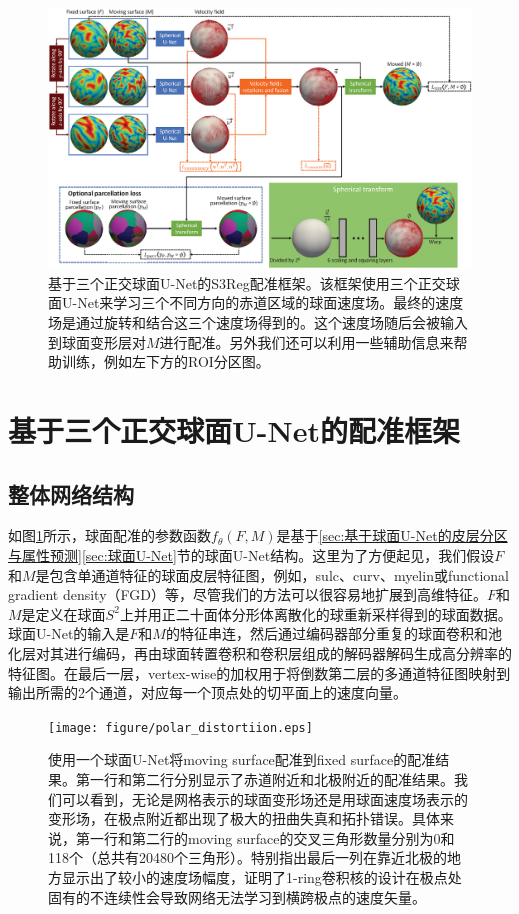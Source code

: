 \begin{figure}[t]
	\centering
	\includegraphics[width=\linewidth]{figure/network.eps}
	\caption{基于三个正交球面U-Net的S3Reg配准框架。该框架使用三个正交球面U-Net来学习三个不同方向的赤道区域的球面速度场。最终的速度场是通过旋转和结合这三个速度场得到的。这个速度场随后会被输入到球面变形层对$M$进行配准。另外我们还可以利用一些辅助信息来帮助训练，例如左下方的ROI分区图。}
	\label{fig:S3Reg_network}
\end{figure}

\section{基于三个正交球面U-Net的配准框架}\label{sec:基于三个正交球面U-Net的配准框架}

\subsection{整体网络结构}
如图\ref{fig:S3Reg_network}所示，球面配准的参数函数$f_\theta(F,M)$是基于\ref{sec:基于球面U-Net的皮层分区与属性预测}\ref{sec:球面U-Net}节的球面U-Net结构。这里为了方便起见，我们假设$F$和$M$是包含单通道特征的球面皮层特征图，例如，sulc、curv、myelin或functional gradient density（FGD）等，尽管我们的方法可以很容易地扩展到高维特征。$F$和$M$是定义在球面$S^2$上并用正二十面体分形体\cite{fischl2012freesurfer}离散化的球重新采样得到的球面数据。球面U-Net的输入是$F$和$M$的特征串连，然后通过编码器部分重复的球面卷积和池化层对其进行编码，再由球面转置卷积和卷积层组成的解码器解码生成高分辨率的特征图。在最后一层，vertex-wise的加权用于将倒数第二层的多通道特征图映射到输出所需的2个通道，对应每一个顶点处的切平面上的速度向量。

\begin{figure}[t]
	\centering
	\texttt{[image: figure/polar\_distortiion.eps]}
	\caption{使用一个球面U-Net将moving surface配准到fixed surface的配准结果。第一行和第二行分别显示了赤道附近和北极附近的配准结果。我们可以看到，无论是网格表示的球面变形场还是用球面速度场表示的变形场，在极点附近都出现了极大的扭曲失真和拓扑错误。具体来说，第一行和第二行的moving surface的交叉三角形数量\cite{moller1997fast}分别为0和118个（总共有20480个三角形）。特别指出最后一列在靠近北极的地方显示出了较小的速度场幅度，证明了1-ring卷积核的设计在极点处固有的不连续性会导致网络无法学习到横跨极点的速度矢量。}
	\label{fig:polar_distortiion}
\end{figure}

